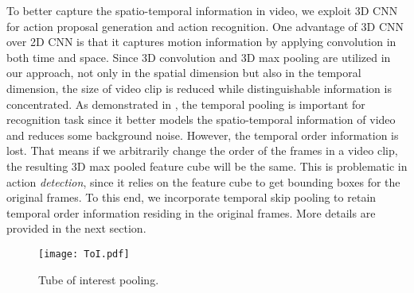 \documentclass[10pt,twocolumn,letterpaper]{article}
\begin{document}
To better capture the spatio-temporal information in video, we exploit 3D CNN for action proposal generation and action recognition. One advantage of 3D CNN over 2D CNN is that it captures motion information by applying convolution in both time and space. Since 3D convolution and 3D max pooling are utilized in our approach, not only in the spatial dimension but also in the temporal dimension, the size of video clip is reduced while distinguishable information is concentrated. As demonstrated in \cite{c3d}, the temporal pooling is important for recognition task since it better models the spatio-temporal information of video and reduces some background noise. However, the temporal order information is lost. That means if we arbitrarily change the order of the frames in a video clip, the resulting 3D max pooled feature cube will be the same. This is problematic in action {\em detection}, since it relies on the feature cube to get bounding boxes for the original frames. To this end, we incorporate temporal skip pooling to retain temporal order information residing in the original frames. More details are provided in the next section.











\begin{figure}[!htb]
\centering
\texttt{[image: ToI.pdf]}
\caption{Tube of interest pooling.}
\label{fig:toi_pool}
\end{figure}
\end{document}
